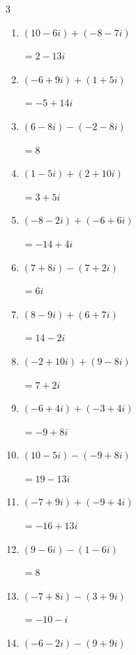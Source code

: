 \begin{multicols}{3}
\begin{enumerate}
  \item $\displaystyle (10-6i) + (-8-7i)$

        $\displaystyle =2-13i$

  \item $\displaystyle (-6+9i) + (1+5i)$

        $\displaystyle =-5+14i$

  \item $\displaystyle (6-8i) - (-2-8i)$

        $\displaystyle =8$

  \item $\displaystyle (1-5i) + (2+10i)$

        $\displaystyle =3+5i$

  \item $\displaystyle (-8-2i) + (-6+6i)$

        $\displaystyle =-14+4i$

  \item $\displaystyle (7+8i) - (7+2i)$

        $\displaystyle =6i$

\columnbreak %

  \item $\displaystyle (8-9i) + (6+7i)$

        $\displaystyle =14-2i$

  \item $\displaystyle (-2+10i) + (9-8i)$

        $\displaystyle =7+2i$

  \item $\displaystyle (-6+4i) + (-3+4i)$

        $\displaystyle =-9+8i$

  \item $\displaystyle (10-5i) - (-9+8i)$

        $\displaystyle =19-13i$

  \item $\displaystyle (-7+9i) + (-9+4i)$

        $\displaystyle =-16+13i$

  \item $\displaystyle (9-6i) - (1-6i)$

        $\displaystyle =8$

  \item $\displaystyle (-7+8i) - (3+9i)$

        $\displaystyle =-10-i$

  \item $\displaystyle (-6-2i) - (9+9i)$


\end{enumerate}
\end{multicols}

